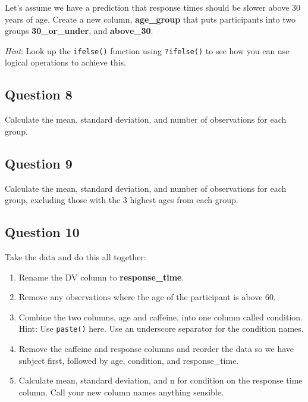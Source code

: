 \documentclass[
]{book}
\providecommand{\tightlist}{%
  \setlength{\itemsep}{0pt}\setlength{\parskip}{0pt}}
\begin{document}
Let's assume we have a prediction that response times should be slower above 30 years of age. Create a new column, \textbf{age\_group} that puts participants into two groups \textbf{30\_or\_under}, and \textbf{above\_30}.

\emph{Hint}: Look up the \texttt{ifelse()} function using \texttt{?ifelse()} to see how you can use logical operations to achieve this.

\hypertarget{question-8-4}{%
\subsection{Question 8}\label{question-8-4}}

Calculate the mean, standard deviation, and number of observations for each group.

\hypertarget{question-9-4}{%
\subsection{Question 9}\label{question-9-4}}

Calculate the mean, standard deviation, and number of observations for each group, excluding those with the 3 highest ages from each group.

\hypertarget{question-10-3}{%
\subsection{Question 10}\label{question-10-3}}

Take the data and do this all together:

\begin{enumerate}
\def\labelenumi{\arabic{enumi}.}
\tightlist
\item
  Rename the DV column to \textbf{response\_time}.
\item
  Remove any observations where the age of the participant is above 60.
\item
  Combine the two columns, age and caffeine, into one column called condition. Hint: Use \texttt{paste()} here. Use an underscore separator for the condition names.
\item
  Remove the caffeine and response columns and reorder the data so we have subject first, followed by age, condition, and response\_time.
\item
  Calculate mean, standard deviation, and n for condition on the response time column. Call your new column names anything sensible.
\end{enumerate}
\end{document}
